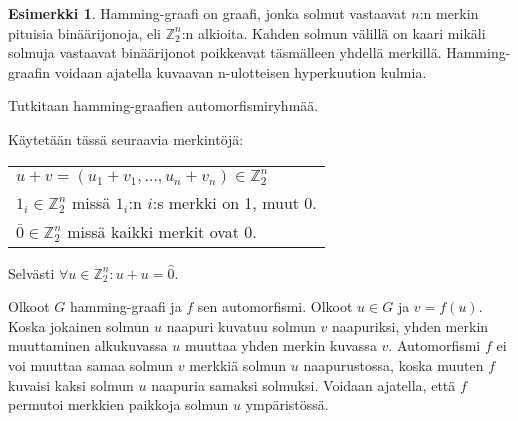 \documentclass[a4paper, 12pt]{article}
\theoremstyle{definition}
\newtheorem{example}[mydef]{Esimerkki}
\theoremstyle{plain}
\begin{document}
\begin{example}
Hamming-graafi on graafi, jonka solmut vastaavat $n$:n merkin pituisia binäärijonoja, eli $\mathbb{Z}_2^n$:n alkioita. Kahden solmun välillä on kaari mikäli solmuja vastaavat binäärijonot poikkeavat täsmälleen yhdellä merkillä. Hamming-graafin voidaan ajatella kuvaavan n-ulotteisen hyperkuution kulmia.

\begin{center}
\end{center}

Tutkitaan hamming-graafien automorfismiryhmää.

Käytetään tässä seuraavia merkintöjä:
\begin{center}
\begin{tabular}{l}
$u + v = (u_1 + v_1, \dots, u_n + v_n) \in \mathbb{Z}_2^n$\\
$1_i \in \mathbb{Z}_2^n$ missä $1_i$:n $i$:s merkki on 1, muut 0.\\
$\bar{0} \in \mathbb{Z}_2^n$ missä kaikki merkit ovat 0.
\end{tabular}
\end{center}
Selvästi $ \forall u \in \mathbb{Z}_2^n: u + u = \hat{0}$.

Olkoot $G$ hamming-graafi ja $f$ sen automorfismi. Olkoot $u \in G$ ja $v = f(u)$. Koska jokainen solmun $u$ naapuri kuvatuu solmun $v$ naapuriksi, yhden merkin muuttaminen alkukuvassa $u$ muuttaa yhden merkin kuvassa $v$. Automorfismi $f$ ei voi muuttaa samaa solmun $v$ merkkiä solmun $u$ naapurustossa, koska muuten $f$ kuvaisi kaksi solmun $u$ naapuria samaksi solmuksi. Voidaan ajatella, että $f$ permutoi merkkien paikkoja solmun $u$ ympäristössä. 


\end{example}
\end{document}

